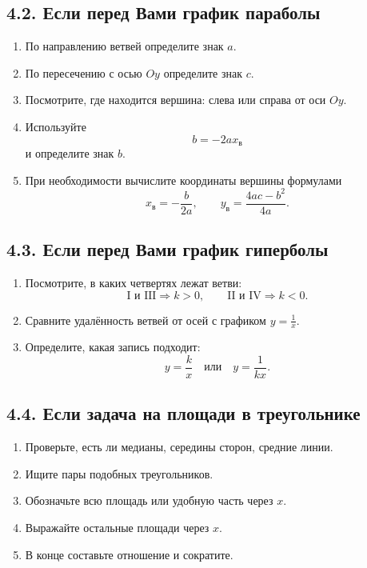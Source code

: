 \documentclass[a4paper,12pt]{article}
\begin{document}
\subsection*{4.2. Если перед Вами график параболы}
\begin{enumerate}
  \item По направлению ветвей определите знак \(a\).
  \item По пересечению с осью \(Oy\) определите знак \(c\).
  \item Посмотрите, где находится вершина: слева или справа от оси \(Oy\).
  \item Используйте
  \[
  b=-2ax_{\text{в}}
  \]
  и определите знак \(b\).
  \item При необходимости вычислите координаты вершины формулами
  \[
  x_{\text{в}}=-\frac{b}{2a}, \qquad
  y_{\text{в}}=\frac{4ac-b^2}{4a}.
  \]
\end{enumerate}

\subsection*{4.3. Если перед Вами график гиперболы}
\begin{enumerate}
  \item Посмотрите, в каких четвертях лежат ветви:
  \[
  \text{I и III} \Rightarrow k>0,\qquad
  \text{II и IV} \Rightarrow k<0.
  \]
  \item Сравните удалённость ветвей от осей с графиком \(y=\frac1x\).
  \item Определите, какая запись подходит:
  \[
  y=\frac{k}{x}\quad \text{или}\quad y=\frac{1}{kx}.
  \]
\end{enumerate}

\subsection*{4.4. Если задача на площади в треугольнике}
\begin{enumerate}
  \item Проверьте, есть ли медианы, середины сторон, средние линии.
  \item Ищите пары подобных треугольников.
  \item Обозначьте всю площадь или удобную часть через \(x\).
  \item Выражайте остальные площади через \(x\).
  \item В конце составьте отношение и сократите.
\end{enumerate}
\end{document}
